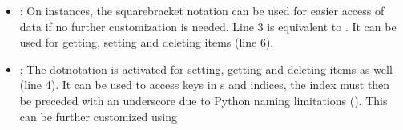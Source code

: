 \documentclass[a4paper,10pt,english]{sphinxmanual}
\begin{document}
\begin{sphinxVerbatim}[commandchars=\\\{\},numbers=left,firstnumber=1,stepnumber=1]
  
\PYG{p}{[}\PYG{p}{]}    
  
 \PYG{p}{[}  \PYG{p}{]}  
\end{sphinxVerbatim}
\begin{itemize}
\item {}
\sphinxAtStartPar
{}: On \sphinxhyphen{}instances, the square\sphinxhyphen{}bracket notation can be used for easier access of data if no further customization is needed. Line 3 is equivalent to . It can be used for getting, setting and deleting items (line 6).

\item {}
\sphinxAtStartPar
{}: The dot\sphinxhyphen{}notation is activated for setting, getting and deleting items as well (line 4). It can be used to access \sphinxhyphen{}keys in s and \sphinxhyphen{}indices, the index must then be preceded with an underscore due to Python naming limitations (). This can be further customized using {\hyperref[\detokenize{README:path-split}]{}}

\end{itemize}
\end{document}
